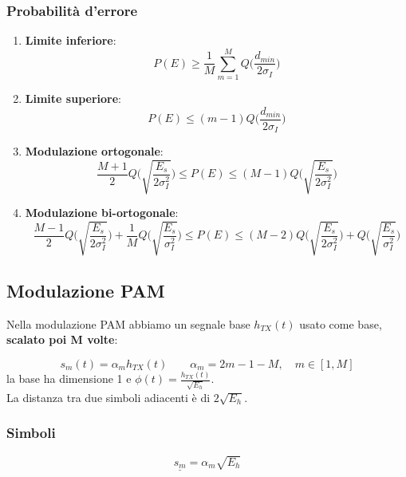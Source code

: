 \documentclass{article}
\begin{document}
\subsubsection{Probabilità d'errore}
\begin{enumerate}
	\item \textbf{Limite inferiore}:$$P(E)\geq\frac{1}{M}\sum_{m=1}^MQ\biggl(\frac{d_{min}}{2\sigma_I}\biggl)$$
	\item \textbf{Limite superiore}:$$P(E)\leq(m-1)Q\biggl(\frac{d_{min}}{2\sigma_I}\biggl)$$
	\item \textbf{Modulazione ortogonale}:$$\frac{M+1}{2}Q\biggl(\sqrt{\frac{E_s}{2\sigma_I^2}}\biggl)\leq P(E)\leq(M-1)Q\biggl(\sqrt{\frac{E_s}{2\sigma_I^2}}\biggl)$$
	\item \textbf{Modulazione bi-ortogonale}:$$\frac{M-1}{2}Q\biggl(\sqrt{\frac{E_s}{2\sigma_I^2}}\biggl)+\frac{1}{M}Q\biggl(\sqrt{\frac{E_s}{\sigma_I^2}}\biggl)\leq P(E)\leq(M-2)Q\biggl(\sqrt{\frac{E_s}{2\sigma_I^2}}\biggl)+Q\biggl(\sqrt{\frac{E_s}{\sigma_I^2}}\biggl)$$
\end{enumerate}

\subsection{Modulazione PAM}
Nella modulazione PAM abbiamo un segnale base $h_{TX}(t)$ usato come base, \textbf{scalato poi  M volte}:
\begin{center}
\end{center}
$$s_m(t)=\alpha_mh_{TX}(t)\qquad\alpha_m=2m-1-M,\quad m\in[1,M]$$
la base ha dimensione 1 e $\phi(t)=\frac{h_{TX}(t)}{\sqrt{E_h}}$.\\
La distanza tra due simboli adiacenti è di $2\sqrt{E_h}$.\\

\subsubsection{Simboli}
$$\underline{s_m}=\alpha_m\sqrt{E_h}$$
\end{document}
